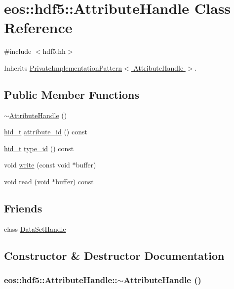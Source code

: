 \hypertarget{classeos_1_1hdf5_1_1AttributeHandle}{
\section{eos::hdf5::AttributeHandle Class Reference}
\label{classeos_1_1hdf5_1_1AttributeHandle}
}


{\ttfamily \#include $<$hdf5.hh$>$}

Inherits \hyperlink{classeos_1_1PrivateImplementationPattern}{PrivateImplementationPattern$<$ AttributeHandle $>$}.\subsection*{Public Member Functions}
\begin{DoxyCompactItemize}
\item 
\hyperlink{classeos_1_1hdf5_1_1AttributeHandle_a8e767c3c6468875d09fa89a446f1eeb3}{$\sim$AttributeHandle} ()
\item 
\hyperlink{namespaceeos_1_1hdf5_a5bd5e209f1bf36cdc5551465dacf2e74}{hid\_\-t} \hyperlink{classeos_1_1hdf5_1_1AttributeHandle_a5412e79df3d179053902e0ac7b5a93ee}{attribute\_\-id} () const 
\item 
\hyperlink{namespaceeos_1_1hdf5_a5bd5e209f1bf36cdc5551465dacf2e74}{hid\_\-t} \hyperlink{classeos_1_1hdf5_1_1AttributeHandle_adc5a9f2119e7de59a83f782d9bae892b}{type\_\-id} () const 
\item 
void \hyperlink{classeos_1_1hdf5_1_1AttributeHandle_acb93f382e986654df68de9389f723efe}{write} (const void $\ast$buffer)
\item 
void \hyperlink{classeos_1_1hdf5_1_1AttributeHandle_a90da07975c70cfdbeab933e68d4ba76a}{read} (void $\ast$buffer) const 
\end{DoxyCompactItemize}
\subsection*{Friends}
\begin{DoxyCompactItemize}
\item 
class \hyperlink{classeos_1_1hdf5_1_1AttributeHandle_ab1c111c97e6fd99718c0c5f172cf76bc}{DataSetHandle}
\end{DoxyCompactItemize}


\subsection{Constructor \& Destructor Documentation}
\hypertarget{classeos_1_1hdf5_1_1AttributeHandle_a8e767c3c6468875d09fa89a446f1eeb3}{
\subsubsection[{$\sim$AttributeHandle}]{\setlength{\rightskip}{0pt plus 5cm}eos::hdf5::AttributeHandle::$\sim$AttributeHandle ()}}
\label{classeos_1_1hdf5_1_1AttributeHandle_a8e767c3c6468875d09fa89a446f1eeb3}



